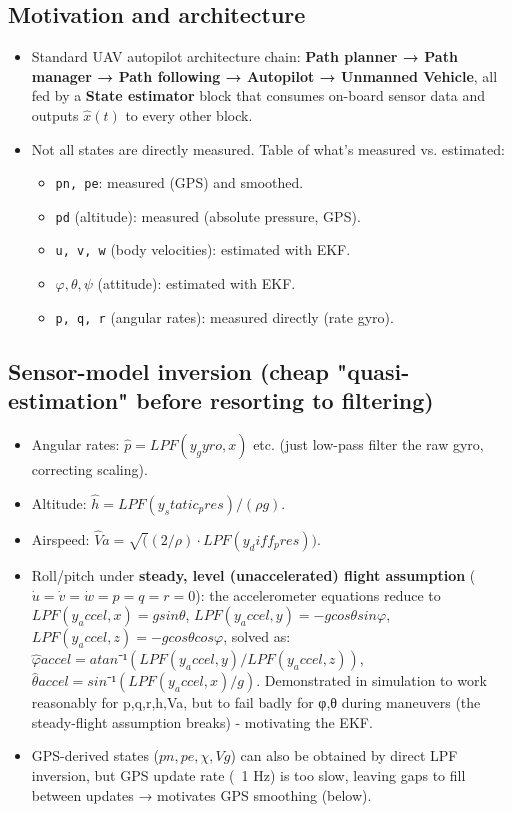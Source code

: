 \documentclass[11pt]{article}
\begin{document}
\subsection{Motivation and architecture}
\begin{itemize}
\item Standard UAV autopilot architecture chain: \textbf{Path planner → Path manager → Path following → Autopilot → Unmanned Vehicle}, all fed by a \textbf{State estimator} block that consumes on-board sensor data and outputs $\hat{x}(t)$ to every other block.
\item Not all states are directly measured. Table of what's measured vs. estimated:
\begin{itemize}
\item \texttt{pn, pe}: measured (GPS) and smoothed.
\item \texttt{pd} (altitude): measured (absolute pressure, GPS).
\item \texttt{u, v, w} (body velocities): estimated with EKF.
\item $φ, θ, ψ$ (attitude): estimated with EKF.
\item \texttt{p, q, r} (angular rates): measured directly (rate gyro).
\end{itemize}
\end{itemize}

\subsection{Sensor-model inversion (cheap "quasi-estimation" before resorting to filtering)}
\begin{itemize}
\item Angular rates: $\hat{p} = LPF(y_gyro,x)$ etc. (just low-pass filter the raw gyro, correcting scaling).
\item Altitude: $\hat{h} = LPF(y_static_pres)/(ρg)$.
\item Airspeed: $\hat{V}a = \sqrt((2/ρ)·LPF(y_diff_pres))$.
\item Roll/pitch under \textbf{steady, level (unaccelerated) flight assumption} ($\dot{u}=\dot{v}=\dot{w}=p=q=r=0$): the accelerometer equations reduce to $LPF(y_accel,x)=g sinθ$, $LPF(y_accel,y)=-g cosθ sinφ$, $LPF(y_accel,z)=-g cosθ cosφ$, solved as:
$\hat{φ}accel = atan⁻¹(LPF(y_accel,y)/LPF(y_accel,z))$, $\hat{θ}accel = sin⁻¹(LPF(y_accel,x)/g)$.
Demonstrated in simulation to work reasonably for p,q,r,h,Va, but to fail badly for φ,θ during maneuvers (the steady-flight assumption breaks) - motivating the EKF.
\item GPS-derived states ($pn,pe,χ,Vg$) can also be obtained by direct LPF inversion, but GPS update rate (~1 Hz) is too slow, leaving gaps to fill between updates → motivates GPS smoothing (below).
\end{itemize}
\end{document}
